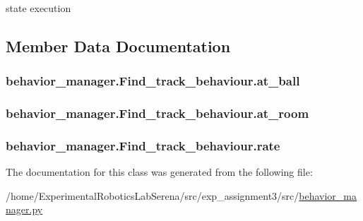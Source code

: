 state execution 

\subsection{Member Data Documentation}
\subsubsection[{\texorpdfstring{at\+\_\+ball}{at_ball}}]{\setlength{\rightskip}{0pt plus 5cm}behavior\+\_\+manager.\+Find\+\_\+track\+\_\+behaviour.\+at\+\_\+ball}\hypertarget{classbehavior__manager_1_1Find__track__behaviour_a6e7788d035404b0eaf79ad5e03fcb697}{}\label{classbehavior__manager_1_1Find__track__behaviour_a6e7788d035404b0eaf79ad5e03fcb697}
\subsubsection[{\texorpdfstring{at\+\_\+room}{at_room}}]{\setlength{\rightskip}{0pt plus 5cm}behavior\+\_\+manager.\+Find\+\_\+track\+\_\+behaviour.\+at\+\_\+room}\hypertarget{classbehavior__manager_1_1Find__track__behaviour_a88ccf669e65adb99390ee8690b7b7b47}{}\label{classbehavior__manager_1_1Find__track__behaviour_a88ccf669e65adb99390ee8690b7b7b47}
\subsubsection[{\texorpdfstring{rate}{rate}}]{\setlength{\rightskip}{0pt plus 5cm}behavior\+\_\+manager.\+Find\+\_\+track\+\_\+behaviour.\+rate}\hypertarget{classbehavior__manager_1_1Find__track__behaviour_a2f4d1da1a2f987c83f65f22ecdf52735}{}\label{classbehavior__manager_1_1Find__track__behaviour_a2f4d1da1a2f987c83f65f22ecdf52735}


The documentation for this class was generated from the following file\+:\begin{DoxyCompactItemize}
\item 
/home/\+Experimental\+Robotics\+Lab\+Serena/src/exp\+\_\+assignment3/src/\hyperlink{behavior__manager_8py}{behavior\+\_\+manager.\+py}\end{DoxyCompactItemize}

